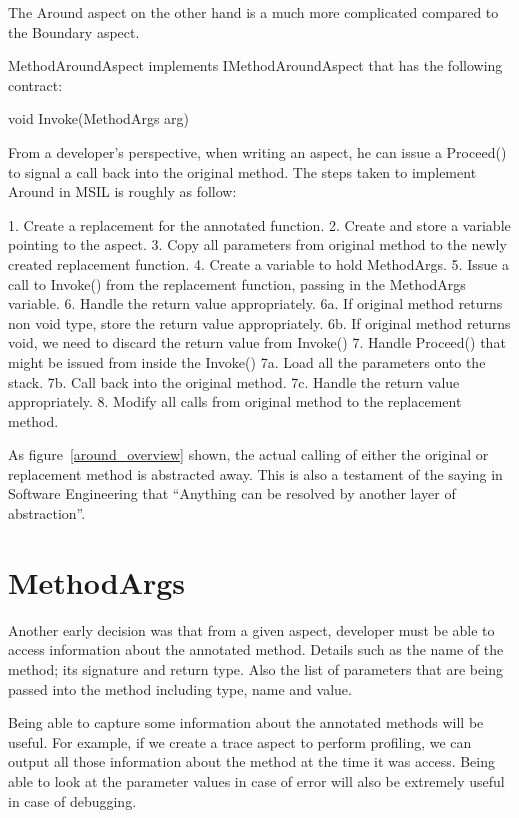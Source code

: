 The Around aspect on the other hand is a much more complicated compared to the Boundary aspect.

MethodAroundAspect implements IMethodAroundAspect that has the following contract:

void Invoke(MethodArgs arg)

From a developer’s perspective, when writing an aspect, he can issue a Proceed() to signal a call back into the original method. The steps taken to implement Around in MSIL is roughly as follow:

1. Create a replacement for the annotated function.
2. Create and store a variable pointing to the aspect.
3. Copy all parameters from original method to the newly created replacement function.
4. Create a variable to hold MethodArgs.
5. Issue a call to Invoke() from the replacement function, passing in the MethodArgs variable.
6. Handle the return value appropriately.
   6a. If original method returns non void type, store the return value appropriately.
   6b. If original method returns void, we need to discard the return value from Invoke()
7. Handle Proceed() that might be issued from inside the Invoke()
   7a. Load all the parameters onto the stack.
   7b. Call back into the original method.
   7c. Handle the return value appropriately.
8. Modify all calls from original method to the replacement method.

As figure~\ref{around_overview} shown, the actual calling of either the original or replacement method is abstracted away. This is also a testament of the saying in Software Engineering that “Anything can be resolved by another layer of abstraction”.

\section{MethodArgs}

Another early decision was that from a given aspect, developer must be able to access information about the annotated method. Details such as the name of the method; its signature and return type. Also the list of parameters that are being passed into the method including type, name and value.

Being able to capture some information about the annotated methods will be useful. For example, if we create a trace aspect to perform profiling, we can output all those information about the method at the time it was access. Being able to look at the parameter values in case of error will also be extremely useful in case of debugging.

